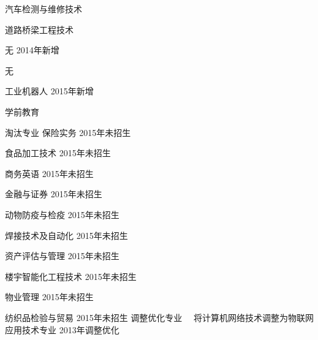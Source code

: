 汽车检测与维修技术


道路桥梁工程技术


无
2014年新增

无


工业机器人
2015年新增

学前教育

淘汰专业
保险实务
2015年未招生

食品加工技术
2015年未招生

商务英语
2015年未招生

金融与证券
2015年未招生

动物防疫与检疫
2015年未招生

焊接技术及自动化
2015年未招生

资产评估与管理
2015年未招生

楼宇智能化工程技术
2015年未招生

物业管理
2015年未招生

纺织品检验与贸易
2015年未招生
调整优化专业　
将计算机网络技术调整为物联网应用技术专业
2013年调整优化

